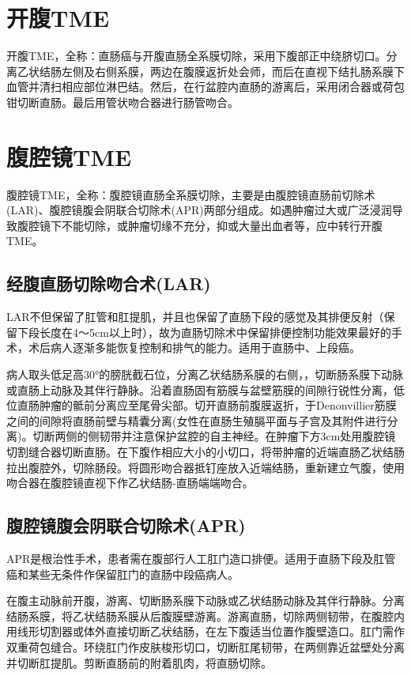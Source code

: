 \documentclass[a4paper,11pt,onecolumn,twoside]{article}
\begin{document}
\begin{multicols}{2}
    \section{开腹TME}
    开腹TME，全称：直肠癌与开腹直肠全系膜切除，采用下腹部正中绕脐切口。分离乙状结肠左侧及右侧系膜，两边在腹膜返折处会师，而后在直视下结扎肠系膜下血管并清扫相应部位淋巴结。然后，在行盆腔内直肠的游离后，采用闭合器或荷包钳切断直肠。最后用管状吻合器进行肠管吻合\supercite{1}。

    \section{腹腔镜TME}
    腹腔镜TME，全称：腹腔镜直肠全系膜切除，主要是由腹腔镜直肠前切除术(LAR)、腹腔镜腹会阴联合切除术(APR)\supercite{2}两部分组成。如遇肿瘤过大或广泛浸润导致腹腔镜下不能切除，或肿瘤切缘不充分，抑或大量出血者等，应中转行开腹TME。
    \subsection{经腹直肠切除吻合术(LAR)}
    LAR不但保留了肛管和肛提肌，并且也保留了直肠下段的感觉及其排便反射（保留下段长度在4～5cm以上时），故为直肠切除术中保留排便控制功能效果最好的手术，术后病人逐渐多能恢复控制和排气的能力。适用于直肠中、上段癌。

    病人取头低足高30°的膀胱截石位，分离乙状结肠系膜的右侧，，切断肠系膜下动脉或直肠上动脉及其伴行静脉。沿着直肠固有筋膜与盆壁筋膜的间隙行锐性分离，低位直肠肿瘤的骶前分离应至尾骨尖部。切开直肠前腹膜返折，于Denonvillier筋膜之间的间隙将直肠前壁与精囊分离(女性在直肠生殖膈平面与子宫及其附件进行分离)。切断两侧的侧韧带并注意保护盆腔的自主神经。在肿瘤下方3cm处用腹腔镜切割缝合器切断直肠。在下腹作相应大小的小切口，将带肿瘤的近端直肠乙状结肠拉出腹腔外，切除肠段。将圆形吻合器抵钉座放入近端结肠，重新建立气腹，使用吻合器在腹腔镜直视下作乙状结肠-直肠端端吻合。

    \subsection{腹腔镜腹会阴联合切除术(APR)}
    APR是根治性手术，患者需在腹部行人工肛门造口排便。适用于直肠下段及肛管癌和某些无条件作保留肛门的直肠中段癌病人\supercite{3}。

    在腹主动脉前开腹，游离、切断肠系膜下动脉或乙状结肠动脉及其伴行静脉。分离结肠系膜，将乙状结肠系膜从后腹膜壁游离。游离直肠，切除两侧韧带，在腹腔内用线形切割器或体外直接切断乙状结肠，在左下腹适当位置作腹壁造口。肛门需作双重荷包缝合。环绕肛门作皮肤梭形切口，切断肛尾韧带，在两侧靠近盆壁处分离并切断肛提肌。剪断直肠前的附着肌肉，将直肠切除。


\end{multicols}
\end{document}
